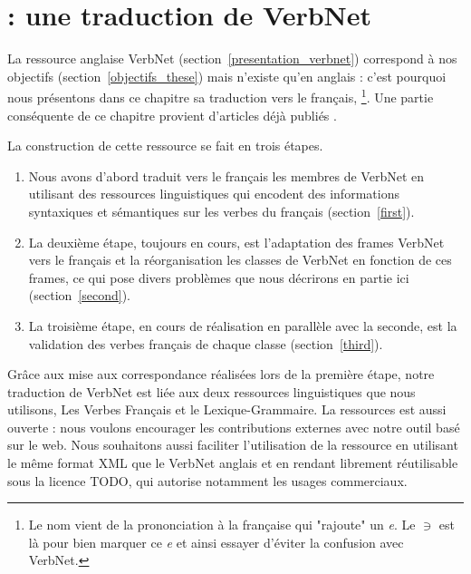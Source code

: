 \chapter{\verbenet{} : une traduction de VerbNet}
\label{ch:verbnet}

La ressource anglaise VerbNet (section~\ref{presentation_verbnet}) correspond à
nos objectifs (section~\ref{objectifs_these}) mais n'existe qu'en anglais :
c'est pourquoi nous présentons dans ce chapitre sa traduction vers le français,
\verbenet{}\footnote{Le nom vient de la prononciation à la française qui
"rajoute" un \emph{e}. Le $\ni$ est là pour bien marquer ce \emph{e} et ainsi
essayer d'éviter la confusion avec VerbNet.}. Une partie conséquente de ce
chapitre provient d'articles déjà publiés
\citep{danlos2014vers,pradet2014adapting}.

La construction de cette ressource se fait en trois étapes.
\begin{enumerate}
    \item Nous avons d'abord traduit vers le français les membres de VerbNet en
        utilisant des ressources linguistiques qui encodent des informations
        syntaxiques et sémantiques sur les verbes du français
        (section~\ref{first}).
    \item La deuxième étape, toujours en cours, est l'adaptation des frames
        VerbNet vers le français et la réorganisation les classes de VerbNet en
        fonction de ces frames, ce qui pose divers problèmes que nous décrirons
        en partie ici (section~\ref{second}).
    \item La troisième étape, en cours de réalisation en parallèle avec la
        seconde, est la validation des verbes français de chaque classe
        (section~\ref{third}).
\end{enumerate}

Grâce aux mise aux correspondance réalisées lors de la première étape, notre
traduction de VerbNet est liée aux deux ressources linguistiques que nous
utilisons, Les Verbes Français et le Lexique-Grammaire. La ressources est aussi
ouverte : nous voulons encourager les contributions externes avec notre outil
basé sur le web. Nous souhaitons aussi faciliter l'utilisation de la ressource
en utilisant le même format XML que le VerbNet anglais et en rendant
\verbenet{} librement réutilisable sous la licence TODO, qui autorise notamment
les usages commerciaux.

